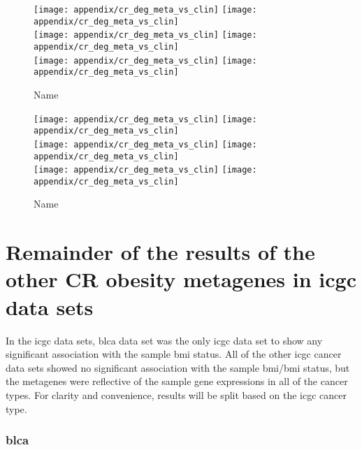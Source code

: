 \begin{appendices}
	\begin{figure}[htpb]
		\ContinuedFloat
		\captionsetup{list=off,format=cont}
		\centering
		\texttt{[image: appendix/cr\_deg\_meta\_vs\_clin]}
		\hfill
		\texttt{[image: appendix/cr\_deg\_meta\_vs\_clin]}\\
		\texttt{[image: appendix/cr\_deg\_meta\_vs\_clin]}
		\hfill
		\texttt{[image: appendix/cr\_deg\_meta\_vs\_clin]}\\
		\texttt{[image: appendix/cr\_deg\_meta\_vs\_clin]}
		\hfill
		\texttt{[image: appendix/cr\_deg\_meta\_vs\_clin]}\\
		\caption{Name}
	\end{figure}

	\begin{figure}[htpb]
		\ContinuedFloat
		\captionsetup{list=off,format=cont}
		\centering
		\texttt{[image: appendix/cr\_deg\_meta\_vs\_clin]}
		\hfill
		\texttt{[image: appendix/cr\_deg\_meta\_vs\_clin]}\\
		\texttt{[image: appendix/cr\_deg\_meta\_vs\_clin]}
		\hfill
		\texttt{[image: appendix/cr\_deg\_meta\_vs\_clin]}\\
		\texttt{[image: appendix/cr\_deg\_meta\_vs\_clin]}
		\hfill
		\texttt{[image: appendix/cr\_deg\_meta\_vs\_clin]}\\
		\caption{Name}
	\end{figure}

	\section{Remainder of the results of the other CR obesity metagenes in \gls{icgc} data sets}
	\label{sec:rest_of_the_cr_ob_meta_heatmap_results_icgc}

	In the \gls{icgc} data sets, \gls{blca} data set was the only \gls{icgc} data set to show any significant association with the sample \gls{bmi} status.
	All of the other \gls{icgc} cancer data sets showed no significant association with the sample \gls{bmi}/\gls{bmi} status, but the metagenes were reflective of the sample gene expressions in all of the cancer types.
	For clarity and convenience, results will be split based on the \gls{icgc} cancer type.

	\subsubsection{\gls{blca}}
	\label{ssub:blca}
	

\end{appendices}

